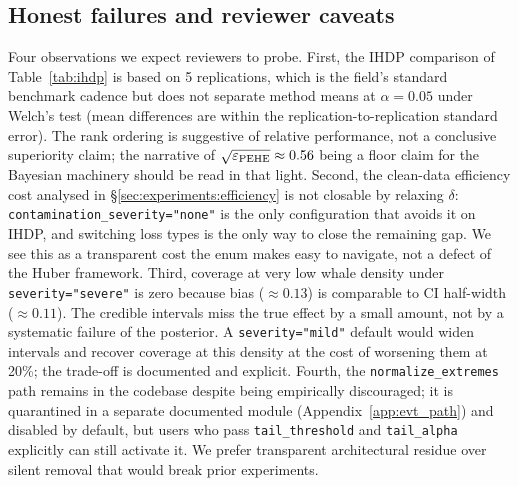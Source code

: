 \subsection{Honest failures and reviewer caveats}
Four observations we expect reviewers to probe. First, the IHDP
comparison of Table~\ref{tab:ihdp} is based on 5 replications,
which is the field's standard benchmark cadence but does not
separate method means at $\alpha = 0.05$ under Welch's test
(mean differences are within the replication-to-replication
standard error). The rank ordering is suggestive of relative
performance, not a conclusive superiority claim; the narrative of
$\sqrt{\varepsilon_{\mathrm{PEHE}}} \approx 0.56$ being a floor claim for the Bayesian machinery
should be read in that light. Second, the
clean-data efficiency cost analysed in
\S\ref{sec:experiments:efficiency} is not closable by relaxing
$\delta$: \texttt{contamination\_severity="none"} is the only
configuration that avoids it on IHDP, and switching loss types
is the only way to close the remaining gap. We see this as a
transparent cost the enum makes easy to navigate, not a defect of
the Huber framework. Third, coverage at very low whale density under
\texttt{severity="severe"} is zero because bias ($\approx 0.13$) is
comparable to CI half-width ($\approx 0.11$). The credible
intervals miss the true effect by a small amount, not by a
systematic failure of the posterior. A \texttt{severity="mild"}
default would widen intervals and recover coverage at this density
at the cost of worsening them at 20\%; the trade-off is documented
and explicit. Fourth, the \texttt{normalize\_extremes} path remains
in the codebase despite being empirically discouraged; it is
quarantined in a separate documented module
(Appendix~\ref{app:evt_path}) and disabled by default, but users
who pass \texttt{tail\_threshold} and \texttt{tail\_alpha}
explicitly can still activate it. We prefer transparent
architectural residue over silent removal that would break
prior experiments.

